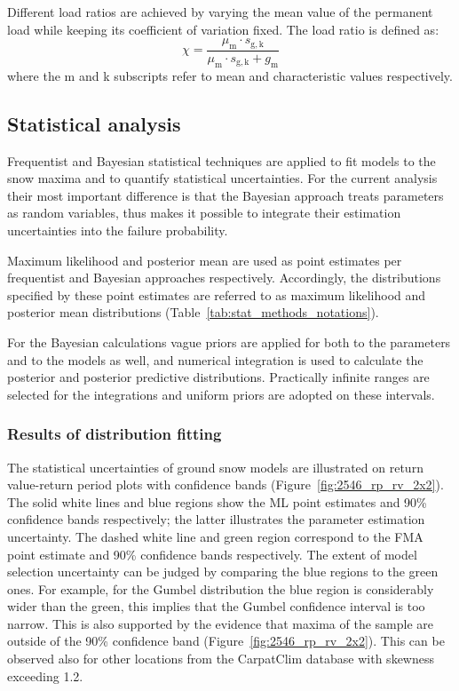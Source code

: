 Different load ratios are achieved by varying the mean value of the permanent load while keeping its coefficient of variation fixed. The load ratio is defined as:
\begin{equation}
	\label{eq:load_ratio}
	\chi  = \frac{{{\mu _{\mathrm{m}}} \cdot {s_{{\mathrm{g,k}}}}}}{{{\mu _{\mathrm{m}}} \cdot {s_{{\mathrm{g,k}}}} + {g_{\mathrm{m}}}}}
\end{equation}
where the m and k subscripts refer to mean and characteristic values respectively.

\subsection{Statistical analysis}
Frequentist and Bayesian statistical techniques are applied to fit models to the snow maxima and to quantify statistical uncertainties. For the current analysis their most important difference is that the Bayesian approach treats parameters as random variables, thus makes it possible to integrate their estimation uncertainties into the failure probability.

Maximum likelihood and posterior mean are used as point estimates per frequentist and Bayesian approaches respectively. Accordingly, the distributions specified by these point estimates are referred to as maximum likelihood and posterior mean distributions (Table~\ref{tab:stat_methods_notations}).

For the Bayesian calculations vague priors are applied for both to the parameters and to the models as well, and numerical integration is used to calculate the posterior and posterior predictive distributions. Practically infinite ranges are selected for the integrations and uniform priors are adopted on these intervals.

\subsubsection{Results of distribution fitting}
The statistical uncertainties of ground snow models are illustrated on return value-return period plots with confidence bands (Figure~\ref{fig:2546_rp_rv_2x2}). The solid white lines and blue regions show the ML point estimates and 90\% confidence bands respectively; the latter illustrates the parameter estimation uncertainty. The dashed white line and green region correspond to the FMA point estimate and 90\% confidence bands respectively. The extent of model selection uncertainty can be judged by comparing the blue regions to the green ones. For example, for the Gumbel distribution the blue region is considerably wider than the green, this implies that the Gumbel confidence interval is too narrow. This is also supported by the evidence that maxima of the sample are outside of the 90\% confidence band (Figure~\ref{fig:2546_rp_rv_2x2}). This can be observed also for other locations from the CarpatClim database with skewness exceeding 1.2.

